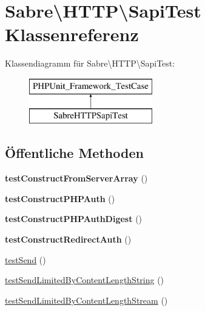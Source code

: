 \hypertarget{class_sabre_1_1_h_t_t_p_1_1_sapi_test}{}\section{Sabre\textbackslash{}H\+T\+TP\textbackslash{}Sapi\+Test Klassenreferenz}
\label{class_sabre_1_1_h_t_t_p_1_1_sapi_test}
Klassendiagramm für Sabre\textbackslash{}H\+T\+TP\textbackslash{}Sapi\+Test\+:\begin{figure}[H]
\begin{center}
\leavevmode
\includegraphics[height=2.000000cm]{class_sabre_1_1_h_t_t_p_1_1_sapi_test}
\end{center}
\end{figure}
\subsection*{Öffentliche Methoden}
\begin{DoxyCompactItemize}
\item 
\mbox{\label{class_sabre_1_1_h_t_t_p_1_1_sapi_test_a36259642f1a0fc0b24bf66252fe1b9c1}} 
{\bfseries test\+Construct\+From\+Server\+Array} ()
\item 
\mbox{\label{class_sabre_1_1_h_t_t_p_1_1_sapi_test_a0b2afa432f7ceea3e290afc8f83edb25}} 
{\bfseries test\+Construct\+P\+H\+P\+Auth} ()
\item 
\mbox{\label{class_sabre_1_1_h_t_t_p_1_1_sapi_test_a4600a0babc569efe9b986c75ecd59171}} 
{\bfseries test\+Construct\+P\+H\+P\+Auth\+Digest} ()
\item 
\mbox{\label{class_sabre_1_1_h_t_t_p_1_1_sapi_test_af32951cb08060c6beabb1aba0f47ede5}} 
{\bfseries test\+Construct\+Redirect\+Auth} ()
\item 
\mbox{\hyperlink{class_sabre_1_1_h_t_t_p_1_1_sapi_test_a3093d3e96d4f0fe6683788b235e19c04}{test\+Send}} ()
\item 
\mbox{\hyperlink{class_sabre_1_1_h_t_t_p_1_1_sapi_test_a36200c0bb1367c40255bf13ac9dbbdc6}{test\+Send\+Limited\+By\+Content\+Length\+String}} ()
\item 
\mbox{\hyperlink{class_sabre_1_1_h_t_t_p_1_1_sapi_test_a670e8a768dcf3e359805e7e05bc31026}{test\+Send\+Limited\+By\+Content\+Length\+Stream}} ()
\end{DoxyCompactItemize}


